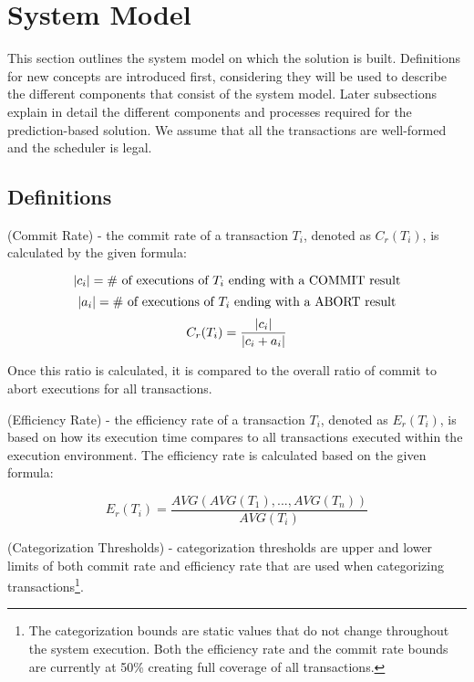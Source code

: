 \section{System Model}
\label{sec:system_model}
This section outlines the system model on which the solution is built. Definitions for new concepts are introduced first, considering they will be used to describe the different components that consist of the system model. Later subsections explain in detail the different components and processes required for the prediction-based solution. We assume that all the transactions are well-formed and the scheduler is legal.

\subsection{Definitions}
\label{definitions}

\begin{definition}
\label{cmt_rate}
 (Commit Rate) - the commit rate of a transaction $T_{i}$, denoted as  $C_{r}(T_{i})$, is calculated by the given formula:
 
 \[\textrm{$\lvert c_{i}\rvert$} = \textrm{\# of executions of $T_{i}$ ending with a COMMIT result}\]
 \[\textrm{$\lvert a_{i}\rvert$} = \textrm{\# of executions of $T_{i}$ ending with a ABORT result}\]
 \[\textrm{$C_{r}(T_{i})$} =\frac{\textrm{$\lvert c_{i}\rvert$}}{\textrm{$\lvert c_{i} + a_{i}\rvert$}}\]
 
 Once this ratio is calculated, it is compared to the overall ratio of commit to abort executions for all transactions.
 
\end{definition}

\begin{definition}
\label{eff_rate}
 (Efficiency Rate) - the efficiency rate of a transaction $T_{i}$, denoted as  $E_{r}(T_{i})$, is based on how its execution time compares to all transactions executed within the execution environment. The efficiency rate is calculated based on the given formula:
 
\[\textrm{$E_{r}(T_{i})$} =\frac{\textrm{$AVG(AVG(T_{1}),...,AVG(T_{n}))$}}{\textrm{$AVG(T_{i})$}}\]
 
\end{definition}

\begin{definition}
\label{cat_bounds}
 (Categorization Thresholds) - categorization thresholds are upper and lower limits of both commit rate and efficiency rate that are used when categorizing transactions\footnote{The categorization bounds are static values that do not change throughout the system execution. Both the efficiency rate and the commit rate bounds are currently at 50\% creating full coverage of all transactions.}.
\end{definition}

